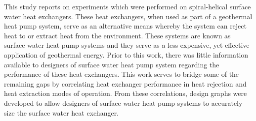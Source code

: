This study reports on experiments which were performed on spiral-helical surface water heat exchangers. These heat exchangers, when used as part of a geothermal heat pump system, serve as an alternative means whereby the system can reject heat to or extract heat from the environment. These systems are known as surface water heat pump systems and they serve as a less expensive, yet effective application of geothermal energy.
Prior to this work, there was little information available to designers of surface water heat pump system regarding the performance of these heat exchangers. This work serves to bridge some of the remaining gaps by correlating heat exchanger performance in heat rejection and heat extraction modes of operation. From these correlations, design graphs were developed to allow designers of surface water heat pump systems to accurately size the surface water heat exchanger.
